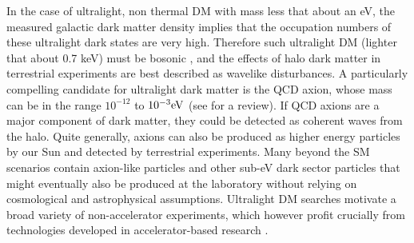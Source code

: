  In the case of ultralight, non thermal DM with mass less that about an eV, the measured galactic dark matter density implies that the occupation numbers of these ultralight dark states are very high. Therefore such ultralight DM (lighter that about 0.7 keV) must be bosonic \cite{Tremaine:1979we}, and 
 the effects of halo dark matter in terrestrial experiments are best described as wavelike disturbances. 
 A particularly compelling candidate for ultralight dark matter is the QCD axion, whose mass can be in the range 
$10^{-12}$ to ${\rm  10^{-3}eV}$ (see \cite{Marsh:2015xka} for a review). 
If QCD axions are a major component of dark matter, they could  be detected as coherent waves from the halo. Quite generally, axions can also be produced as higher energy particles by our Sun and detected by terrestrial experiments. Many beyond the SM scenarios contain axion-like particles and other sub-eV dark sector particles that might eventually also be produced at the laboratory 
without relying on cosmological and astrophysical assumptions. Ultralight DM searches motivate a broad variety of non-accelerator experiments, which however profit crucially from technologies developed in accelerator-based research \cite{Battaglieri:2017aum}.


%
%

